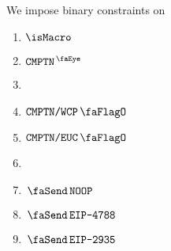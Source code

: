 We impose binary constraints on
\begin{multicols}{2}
	\begin{enumerate}
		\item $\isMacro$
		\item $\isComputation$
		\item[\vspace{\fill}]
		\item $\computationWcpFlag$
		\item $\computationEucFlag$
		\item[\vspace{\fill}]
		\item $\systemTxnNoop$
		\item $\systemTxnEipBeaconRoot$
		\item $\systemTxnEipBlockHash$
	\end{enumerate}
\end{multicols}
